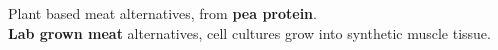 Plant based meat alternatives, from \textbf{pea protein}.\\
\textbf{Lab grown meat} alternatives, cell cultures grow into synthetic muscle tissue.